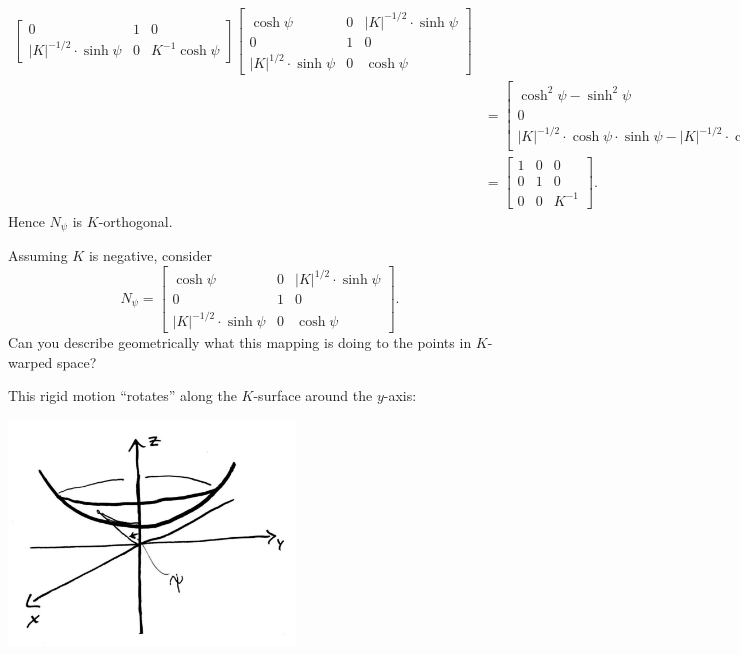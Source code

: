 \documentclass{ximera}
\begin{document}
\begin{problem}
\begin{freeResponse}
\begin{align*}
\begin{bmatrix}
    0 & 1 & 0\\
    |K|^{-1/2}\cdot\sinh\psi & 0 &  K^{-1}\cosh\psi
      \end{bmatrix}
 \begin{bmatrix}
    \cosh\psi & 0 & |K|^{-1/2}\cdot\sinh\psi\\
    0 & 1 & 0\\
    |K|^{1/2}\cdot\sinh\psi & 0 & \cosh\psi
 \end{bmatrix}\\
&=\begin{bmatrix}
    \cosh^2\psi -\sinh^2\psi & 0 & |K|^{-1/2}\cdot\cosh\psi\cdot\sinh\psi- |K|^{-1/2}\cdot\cosh\psi\cdot\sinh\psi\\
    0 & 1 & 0\\
    |K|^{-1/2}\cdot\cosh\psi\cdot\sinh\psi- |K|^{-1/2}\cdot\cosh\psi\cdot\sinh\psi & 0 &  K^{-1}(\cosh^2\psi -\sinh^2\psi )
 \end{bmatrix}\\
 &=\begin{bmatrix}
        1 & 0 & 0 \\
        0 & 1 & 0 \\
        0 & 0 & K^{-1}
      \end{bmatrix}.
    \end{align*}
    Hence $N_\psi$ is $K$-orthogonal.
  \end{freeResponse}
\end{problem}







\begin{problem}
  Assuming $K$ is negative, consider
  \[
  N_\psi=
  \begin{bmatrix}
    \cosh\psi & 0 & |K|^{1/2}\cdot\sinh\psi\\
    0 & 1 & 0\\
    |K|^{-1/2}\cdot\sinh\psi & 0 & \cosh\psi
  \end{bmatrix}.
  \]
  Can you describe geometrically what this mapping is doing to the
  points in $K$-warped space?
  \begin{freeResponse}
    This rigid motion ``rotates'' along the $K$-surface around the $y$-axis:
    \begin{image}
      \includegraphics[width=3in]{hyperRigidMotion.jpg}
    \end{image}
  \end{freeResponse}
\end{problem}
\end{document}
